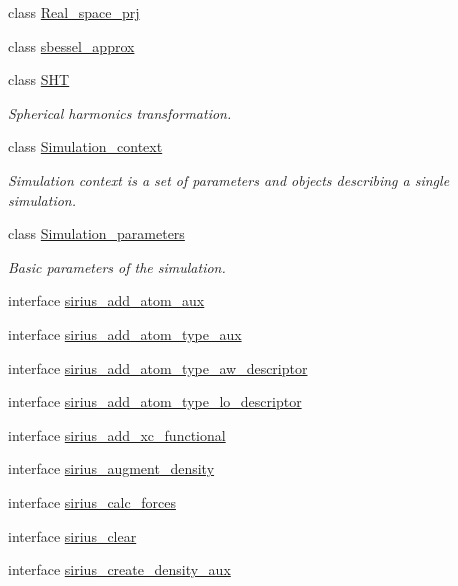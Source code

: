 \begin{DoxyCompactItemize}
class \hyperlink{classsirius_1_1_real__space__prj}{Real\+\_\+space\+\_\+prj}
\item 
class \hyperlink{classsirius_1_1sbessel__approx}{sbessel\+\_\+approx}
\item 
class \hyperlink{classsirius_1_1_s_h_t}{S\+H\+T}
\begin{DoxyCompactList}\small\item\em Spherical harmonics transformation. \end{DoxyCompactList}\item 
class \hyperlink{classsirius_1_1_simulation__context}{Simulation\+\_\+context}
\begin{DoxyCompactList}\small\item\em Simulation context is a set of parameters and objects describing a single simulation. \end{DoxyCompactList}\item 
class \hyperlink{classsirius_1_1_simulation__parameters}{Simulation\+\_\+parameters}
\begin{DoxyCompactList}\small\item\em Basic parameters of the simulation. \end{DoxyCompactList}\item 
interface \hyperlink{interfacesirius_1_1sirius__add__atom__aux}{sirius\+\_\+add\+\_\+atom\+\_\+aux}
\item 
interface \hyperlink{interfacesirius_1_1sirius__add__atom__type__aux}{sirius\+\_\+add\+\_\+atom\+\_\+type\+\_\+aux}
\item 
interface \hyperlink{interfacesirius_1_1sirius__add__atom__type__aw__descriptor}{sirius\+\_\+add\+\_\+atom\+\_\+type\+\_\+aw\+\_\+descriptor}
\item 
interface \hyperlink{interfacesirius_1_1sirius__add__atom__type__lo__descriptor}{sirius\+\_\+add\+\_\+atom\+\_\+type\+\_\+lo\+\_\+descriptor}
\item 
interface \hyperlink{interfacesirius_1_1sirius__add__xc__functional}{sirius\+\_\+add\+\_\+xc\+\_\+functional}
\item 
interface \hyperlink{interfacesirius_1_1sirius__augment__density}{sirius\+\_\+augment\+\_\+density}
\item 
interface \hyperlink{interfacesirius_1_1sirius__calc__forces}{sirius\+\_\+calc\+\_\+forces}
\item 
interface \hyperlink{interfacesirius_1_1sirius__clear}{sirius\+\_\+clear}
\item 
interface \hyperlink{interfacesirius_1_1sirius__create__density__aux}{sirius\+\_\+create\+\_\+density\+\_\+aux}

\end{DoxyCompactItemize}
